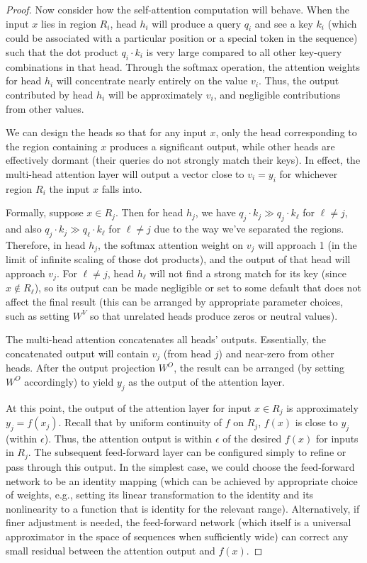 \documentclass[conference]{IEEEtran}
\begin{document}
\begin{proof}
Now consider how the self-attention computation will behave. When the input $x$ lies in region $R_i$, head $h_i$ will produce a query $q_i$ and see a key $k_i$ (which could be associated with a particular position or a special token in the sequence) such that the dot product $q_i \cdot k_i$ is very large compared to all other key-query combinations in that head. Through the softmax operation, the attention weights for head $h_i$ will concentrate nearly entirely on the value $v_i$. Thus, the output contributed by head $h_i$ will be approximately $v_i$, and negligible contributions from other values.

We can design the heads so that for any input $x$, only the head corresponding to the region containing $x$ produces a significant output, while other heads are effectively dormant (their queries do not strongly match their keys). In effect, the multi-head attention layer will output a vector close to $v_i = y_i$ for whichever region $R_i$ the input $x$ falls into.

Formally, suppose $x \in R_j$. Then for head $h_j$, we have $q_j \cdot k_j \gg q_j \cdot k_\ell$ for $\ell \neq j$, and also $q_j \cdot k_j \gg q_\ell \cdot k_\ell$ for $\ell \neq j$ due to the way we've separated the regions. Therefore, in head $h_j$, the softmax attention weight on $v_j$ will approach 1 (in the limit of infinite scaling of those dot products), and the output of that head will approach $v_j$. For $\ell \neq j$, head $h_\ell$ will not find a strong match for its key (since $x \notin R_\ell$), so its output can be made negligible or set to some default that does not affect the final result (this can be arranged by appropriate parameter choices, such as setting $W^V$ so that unrelated heads produce zeros or neutral values).

The multi-head attention concatenates all heads' outputs. Essentially, the concatenated output will contain $v_j$ (from head $j$) and near-zero from other heads. After the output projection $W^O$, the result can be arranged (by setting $W^O$ accordingly) to yield $y_j$ as the output of the attention layer.

At this point, the output of the attention layer for input $x \in R_j$ is approximately $y_j = f(x_j)$. Recall that by uniform continuity of $f$ on $R_j$, $f(x)$ is close to $y_j$ (within $\epsilon$). Thus, the attention output is within $\epsilon$ of the desired $f(x)$ for inputs in $R_j$. The subsequent feed-forward layer can be configured simply to refine or pass through this output. In the simplest case, we could choose the feed-forward network to be an identity mapping (which can be achieved by appropriate choice of weights, e.g., setting its linear transformation to the identity and its nonlinearity to a function that is identity for the relevant range). Alternatively, if finer adjustment is needed, the feed-forward network (which itself is a universal approximator in the space of sequences when sufficiently wide) can correct any small residual between the attention output and $f(x)$.


\end{proof}
\end{document}
